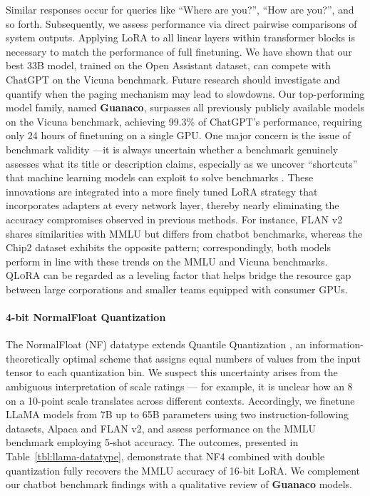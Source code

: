Similar responses occur for queries like ``Where are you?'', ``How are you?'', and so forth. Subsequently, we assess performance via direct pairwise comparisons of system outputs. Applying LoRA to all linear layers within transformer blocks is necessary to match the performance of full finetuning. We have shown that our best 33B model, trained on the Open Assistant dataset, can compete with ChatGPT on the Vicuna benchmark. Future research should investigate and quantify when the paging mechanism may lead to slowdowns. Our top-performing model family, named \textbf{Guanaco}, surpasses all previously publicly available models on the Vicuna benchmark, achieving 99.3\% of ChatGPT's performance, requiring only 24 hours of finetuning on a single GPU. One major concern is the issue of benchmark validity \citep{liao2021we}—it is always uncertain whether a benchmark genuinely assesses what its title or description claims, especially as we uncover “shortcuts” that machine learning models can exploit to solve benchmarks \citep{gururangan2018annotation, poliak2018hypothesis}. These innovations are integrated into a more finely tuned LoRA strategy that incorporates adapters at every network layer, thereby nearly eliminating the accuracy compromises observed in previous methods. For instance, FLAN v2 shares similarities with MMLU but differs from chatbot benchmarks, whereas the Chip2 dataset exhibits the opposite pattern; correspondingly, both models perform in line with these trends on the MMLU and Vicuna benchmarks. \textsc{QLoRA} can be regarded as a leveling factor that helps bridge the resource gap between large corporations and smaller teams equipped with consumer GPUs. \paragraph{4-bit NormalFloat Quantization} The NormalFloat (NF) datatype extends Quantile Quantization \citep{dettmers2022optimizers}, an information-theoretically optimal scheme that assigns equal numbers of values from the input tensor to each quantization bin. We suspect this uncertainty arises from the ambiguous interpretation of scale ratings — for example, it is unclear how an 8 on a 10-point scale translates across different contexts. Accordingly, we finetune LLaMA models from 7B up to 65B parameters using two instruction-following datasets, Alpaca and FLAN v2, and assess performance on the MMLU benchmark employing 5-shot accuracy. The outcomes, presented in Table~\ref{tbl:llama-datatype}, demonstrate that NF4 combined with double quantization fully recovers the MMLU accuracy of 16-bit LoRA. We complement our chatbot benchmark findings with a qualitative review of \textbf{Guanaco} models. 

